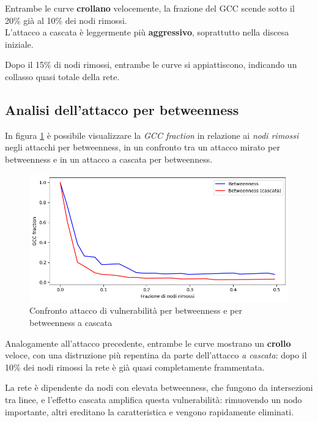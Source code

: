 Entrambe le curve \textbf{crollano} velocemente, la frazione del GCC scende sotto il 20\% già al 10\% dei nodi rimossi. \\
L'attacco a cascata è leggermente più \textbf{aggressivo}, soprattutto nella discesa iniziale.

Dopo il 15\% di nodi rimossi, entrambe le curve si appiattiscono, indicando un collasso quasi totale della rete.

\subsection{Analisi dell'attacco per betweenness}
In figura \ref{fig: Confronto attacco di vulnerabilità per betweenness e per betweenness a cascata} è possibile visualizzare la \textit{GCC fraction} in relazione ai \textit{nodi rimossi} negli attacchi per betweenness, in un confronto tra un attacco mirato per betweenness e in un attacco a cascata per betweenness.

\vspace{1em}
\begin{figure}[h!]
    \centering
    \includegraphics[width=0.8\linewidth]{Immagini//Capitoli//cap5/atk_btw_cfr.png}
    \caption{Confronto attacco di vulnerabilità per betweenness e per betweenness a cascata}
    \label{fig: Confronto attacco di vulnerabilità per betweenness e per betweenness a cascata}
\end{figure}
\vspace{1em}

Analogamente all'attacco precedente, entrambe le curve mostrano un \textbf{crollo} veloce, con una distruzione più repentina da parte dell'attacco \textit{a cascata}: dopo il 10\% dei nodi rimossi la rete è già quasi completamente frammentata.

La rete è dipendente da nodi con elevata betweenness, che fungono da intersezioni tra linee, e l’effetto cascata amplifica questa vulnerabilità: rimuovendo un nodo importante, altri ereditano la caratteristica e vengono rapidamente eliminati.

